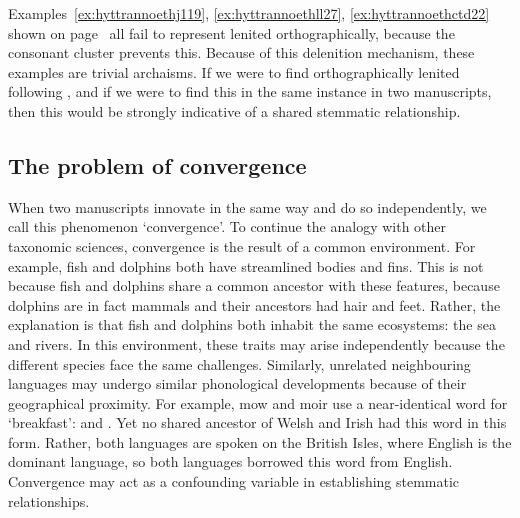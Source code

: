 Examples~\ref{ex:hyttrannoethj119}, \ref{ex:hyttrannoethll27}, \ref{ex:hyttrannoethctd22} shown on page~ all fail to represent lenited  orthographically, because the  consonant cluster prevents this. Because of this delenition mechanism, these examples are trivial archaisms. If we were to find orthographically lenited  following , and if we were to find this in the same instance in two manuscripts, then this would be strongly indicative of a shared stemmatic relationship.


\subsection{The problem of convergence}
\label{sec:problem-convergence}

When two manuscripts innovate in the same way and do so independently, we  call this phenomenon `convergence'. To continue the analogy with other taxonomic sciences, convergence is the result of a common environment. For example, fish and dolphins both have streamlined bodies and fins. This is not because fish and dolphins share a common ancestor with these features, because dolphins are in fact mammals and their ancestors had hair and feet. Rather, the explanation is that fish and dolphins both inhabit the same ecosystems: the sea and rivers. In this environment, these traits may arise independently because the different species face the same challenges. Similarly, unrelated neighbouring languages may undergo similar phonological developments because of their geographical proximity. For example, \gls{mow} and \gls{moir} use a near-identical word for `breakfast':  and . Yet no shared ancestor of Welsh and Irish had this word in this form. Rather, both languages are spoken on the British Isles, where English is the dominant language, so both languages borrowed this word from English. Convergence may act as a confounding variable in establishing stemmatic relationships.

